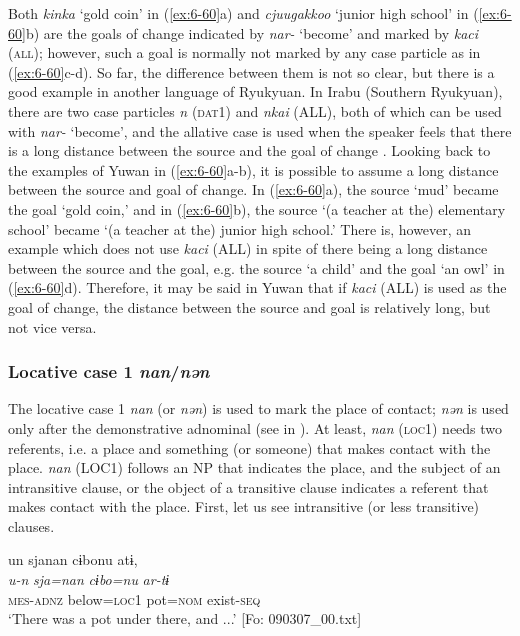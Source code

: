 \begin{table}
Both \textit{kinka} ‘gold coin’ in (\ref{ex:6-60}a) and \textit{cjuugakkoo} ‘junior high school’ in (\ref{ex:6-60}b) are the goals of change indicated by \textit{nar-} ‘become’ and marked by \textit{kaci} (\textsc{all}); however, such a goal is normally not marked by any case particle as in (\ref{ex:6-60}c-d). So far, the difference between them is not so clear, but there is a good example in another language of Ryukyuan. In Irabu (Southern Ryukyuan), there are two case particles \textit{n} (\textsc{dat}1) and \textit{nkai} (ALL), both of which can be used with \textit{nar-} ‘become’, and the allative case is used when the speaker feels that there is a long distance between the source and the goal of change \citep{Shimoji2013}. Looking back to the examples of Yuwan in (\ref{ex:6-60}a-b), it is possible to assume a long distance between the source and goal of change. In (\ref{ex:6-60}a), the source ‘mud’ became the goal ‘gold coin,’ and in (\ref{ex:6-60}b), the source ‘(a teacher at the) elementary school’ became ‘(a teacher at the) junior high school.’ There is, however, an example which does not use \textit{kaci} (ALL) in spite of there being a long distance between the source and the goal, e.g. the source ‘a child’ and the goal ‘an owl’ in (\ref{ex:6-60}d). Therefore, it may be said in Yuwan that if \textit{kaci} (ALL) is used as the goal of change, the distance between the source and goal is relatively long, but not vice versa.

\subsubsection{Locative case 1 \textit{nan}/\textit{nən}}

The locative case 1 \textit{nan} (or \textit{nən}) is used to mark the place of contact; \textit{nən} is used only after the demonstrative adnominal (see  in ). At least, \textit{nan} (\textsc{loc}1) needs two referents, i.e. a place and something (or someone) that makes contact with the place. \textit{nan} (LOC1) follows an NP that indicates the place, and the subject of an intransitive clause, or the object of a transitive clause indicates a referent that makes contact with the place. First, let us see intransitive (or less transitive) clauses.

\ea\label{ex:6-61}
\ea {\TM}  un  sjanan  cɨbonu  atɨ,\\
\glll \textit{u-n}  \textit{sja=nan}  \textit{cɨbo=nu}  \textit{ar-tɨ}\\
\textsc{mes}-\textsc{adnz}  below=\textsc{loc}1  pot=\textsc{nom}  exist-\textsc{seq}\\
\glt ‘There was a pot under there, and ...’ [Fo: 090307\_00.txt]
\z


\end{table}
